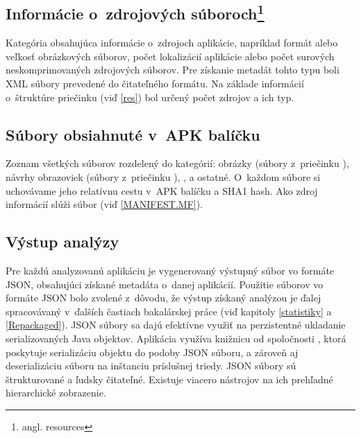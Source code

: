 \subsection*{Informácie o~zdrojových súboroch\footnote{angl. resources}} 
Kategória obsahujúca informácie o~zdrojoch aplikácie, napríklad formát alebo veľkosť obrázkových súborov, počet lokalizácií aplikácie alebo počet surových neskomprimovaných zdrojových súborov. Pre získanie metadát tohto typu boli XML súbory prevedené do čitateľného formátu. Na základe informácií o~štruktúre priečinku  (viď \ref{res}) bol určený počet zdrojov a ich typ.
\subsection*{Súbory obsiahnuté v~APK balíčku}
Zoznam všetkých súborov rozdelený do kategórií: obrázky (súbory z~priečinku ), návrhy obrazoviek (súbory z~priečinku ), ,  a ostatné. O~každom súbore si uchovávame jeho relatívnu cestu v~APK balíčku a SHA1 hash. Ako zdroj informácií slúži súbor  (viď \ref{MANIFEST.MF}).


\subsection{Výstup analýzy}
Pre každú analyzovanú aplikáciu je vygenerovaný výstupný súbor vo formáte JSON, obsahujúci získané metadáta o~danej aplikácií. Použitie súborov vo formáte JSON bolo zvolené z~dôvodu, že výstup získaný analýzou je ďalej spracovávaný v~ďalších častiach bakalárskej práce (viď kapitoly \ref{statistiky} a \ref{Repackaged}). JSON súbory sa dajú efektívne využiť na perzistentné ukladanie serializovaných Java objektov. Aplikácia  využíva knižnicu  od spoločnosti , ktorá poskytuje serializáciu objektu do podoby JSON súboru, a zároveň aj deserializáciu súboru na inštanciu príslušnej triedy. JSON súbory sú štrukturované a ľudsky čitateľné. Existuje viacero nástrojov na ich prehľadné hierarchické zobrazenie.  